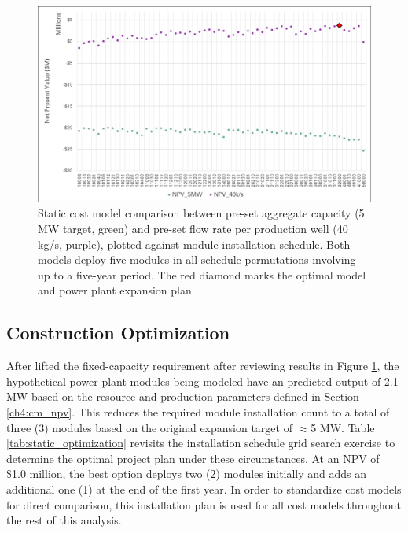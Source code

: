 \begin{figure}[!htp]
\centering
\includegraphics[width=.98\textwidth]
{templates/images/Figure-Static_Model_Construction.png}
\caption[Static cost model comparison]{Static cost model comparison between pre-set aggregate capacity (5 MW target, green) and pre-set flow rate per production well (40 kg/s, purple), plotted against module installation schedule. Both models deploy five modules in all schedule permutations involving up to a five-year period. The red diamond marks the optimal model and power plant expansion plan.}
\label{fig:static_model_compare}
\end{figure}

\subsection{Construction Optimization}
\label{ch6:static_schedule}

After lifted the fixed-capacity requirement after reviewing results in Figure \ref{fig:static_model_compare}, the hypothetical power plant modules being modeled have an predicted output of 2.1 MW based on the resource and production parameters defined in Section \ref{ch4:cm_npv}. This reduces the required module installation count to a total of three (3) modules based on the original expansion target of $\approx$5 MW. Table \ref{tab:static_optimization} revisits the installation schedule grid search exercise to determine the optimal project plan under these circumstances. At an NPV of \$1.0 million, the best option deploys two (2) modules initially and adds an additional one (1) at the end of the first year. In order to standardize cost models for direct comparison, this installation plan is used for all cost models throughout the rest of this analysis.


